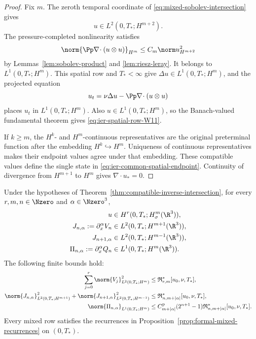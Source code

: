 \begin{proof}
Fix \(m\).  The zeroth temporal coordinate of
\eqref{eq:mixed-sobolev-intersection} gives
\[
 u\in L^2(0,T_*;H^{m+2}).
\]
The pressure-completed nonlinearity satisfies
\[
 \norm{\Pp\nabla\!\cdot(u\otimes u)}_{H^m}
 \le C_m\norm u_{H^{m+2}}^2
\]
by Lemmas~\ref{lem:sobolev-product} and \ref{lem:riesz-leray}.  It belongs
to \(L^1(0,T_*;H^m)\).  This spatial row and \(T_*<\infty\) give
\(\Delta u\in L^1(0,T_*;H^m)\), and the projected equation
\[
 u_t=\nu\Delta u-\Pp\nabla\!\cdot(u\otimes u)
\]
places \(u_t\) in \(L^1(0,T_*;H^m)\).  Also
\(u\in L^1(0,T_*;H^m)\), so the Banach-valued fundamental theorem gives
\eqref{eq:ier-spatial-row-W11}.

If \(k\ge m\), the \(H^k\)- and \(H^m\)-continuous representatives are
the original preterminal function after the embedding \(H^k\hookrightarrow
H^m\).  Uniqueness of continuous representatives makes their endpoint
values agree under that embedding.  These compatible values define the
single state in \eqref{eq:ier-common-spatial-endpoint}.  Continuity of
divergence from \(H^{m+1}\) to \(H^m\) gives \(\nabla\cdot u_*=0\).
\end{proof}

\begin{corollary}
\label{cor:ier-whole-terminal-mixed-jet}
Under the hypotheses of Theorem~\ref{thm:compatible-inverse-intersection},
for every \(r,m,n\in\Nzero\) and \(\alpha\in\Nzero^3\),
\begin{align}
 u&\in H^r(0,T_*;H^m_\sigma(\R^3)),
 \label{eq:ier-whole-terminal-bochner}\\
 J_{n,\alpha}:=\partial_x^\alpha V_n
 &\in L^2(0,T_*;H^{m+1}(\R^3)),
 \label{eq:ier-whole-terminal-mixed-upper}\\
 J_{n+1,\alpha}
 &\in L^2(0,T_*;H^{m-1}(\R^3)),
 \label{eq:ier-whole-terminal-mixed-lower}\\
 \Pi_{n,\alpha}:=\partial_x^\alpha Q_n
 &\in L^1(0,T_*;H^m(\R^3)).
 \label{eq:ier-whole-terminal-mixed-pressure}
\end{align}
The following finite bounds hold:
\begin{align}
 \sum_{j=0}^{r}\norm{V_j}_{L^2(0,T_*;H^m)}^2
 &\le\mathfrak R_{r,m}^*[u_0,\nu,T_*],
 \label{eq:ier-finite-bochner-bound}\\
 \norm{J_{n,\alpha}}_{L^2(0,T_*;H^{m+1})}^2
 +\norm{J_{n+1,\alpha}}_{L^2(0,T_*;H^{m-1})}^2
 &\le\mathfrak R_{n,m+|\alpha|}^*[u_0,\nu,T_*],
 \label{eq:ier-finite-mixed-bound}\\
 \norm{\Pi_{n,\alpha}}_{L^1(0,T_*;H^m)}
 &\le C_{m+|\alpha|}^{\rm p}(2^{n+1}-1)
 \mathfrak R_{n,m+|\alpha|}^*[u_0,\nu,T_*].
 \label{eq:ier-finite-mixed-pressure-bound}
\end{align}
Every mixed row satisfies the recurrences in
Proposition~\ref{prop:formal-mixed-recurrences} on \((0,T_*)\).
\end{corollary}

